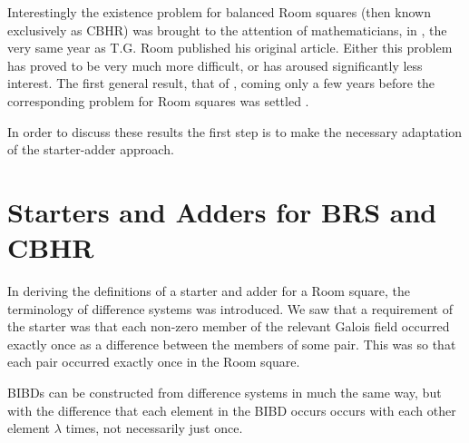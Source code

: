 Interestingly the existence problem for balanced Room squares (then known exclusively as CBHR) was brought to the attention of mathematicians, in
\cite{parkerBalancedHowellRotations1955},
the very same year as T.G. Room published his original article.
Either this problem has proved to be very much more difficult, or has aroused significantly less interest.
The first general result, that of
\cite{hwangMoreContributionsConstructing1970},
coming only a few years before the corresponding problem for Room squares was settled
\cite{wallisExistenceRoomSquares1973}.

In order to discuss these results the first step is to make the necessary adaptation of the starter-adder approach.

\section{Starters and Adders for BRS and CBHR}

In deriving the definitions of a starter and adder for a Room square, the terminology of difference systems was introduced.
We saw that a requirement of the starter was that each non-zero member of the relevant Galois field occurred exactly once as a difference between the members of some pair.
This was so that each pair occurred exactly once in the Room square.

BIBDs can be constructed from difference systems in much the same way, but with the difference that each element in the BIBD occurs occurs with each other element $\lambda$ times, not necessarily just once.

